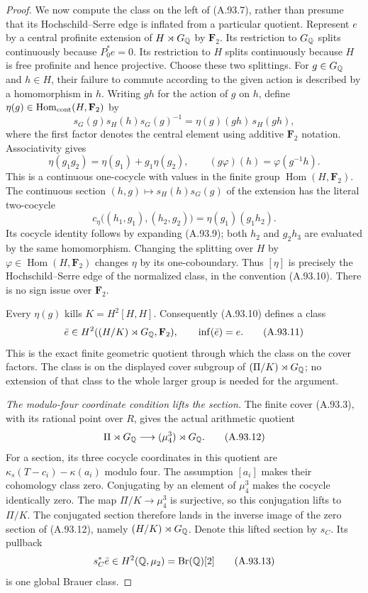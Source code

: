 \begin{proof}
We now compute the class on the left of
(A.93.7), rather than presume that its
Hochschild--Serre edge is inflated from a
particular quotient.
Represent $e$ by a central profinite extension
of $H\rtimes G_\mathbb Q$ by $\mathbf F_2$.
Its restriction to $G_\mathbb Q$ splits continuously
because $P_0^*e=0$.
Its restriction to $H$ splits continuously
because $H$ is free profinite and hence
projective.
Choose these two splittings.
For $g\in G_\mathbb Q$ and $h\in H$, their failure
to commute according to the given action is
described by a homomorphism in $h$.
Writing $gh$ for the action of $g$ on $h$,
define $\eta(g)\in\operatorname{Hom}_{\rm cont}
(H,\mathbf F_2)$ by
\[
 s_G(g)s_H(h)s_G(g)^{-1}
       =\eta(g)(gh)\,s_H(gh),
 \tag{A.93.8}
\]
where the first factor denotes the central
element using additive $\mathbf F_2$ notation.
Associativity gives
\[
                 \eta(g_1g_2)=\eta(g_1)+g_1\eta(g_2),
       \qquad (g\varphi)(h)=\varphi(g^{-1}h).
 \tag{A.93.9}
\]
This is a continuous one-cocycle with values
in the finite group
$\operatorname{Hom}(H,\mathbf F_2)$.
The continuous section
$(h,g)\mapsto s_H(h)s_G(g)$ of the extension
has the literal two-cocycle
\[
 c_\eta\bigl((h_1,g_1),(h_2,g_2)\bigr)
                          =\eta(g_1)(g_1h_2).
 \tag{A.93.10}
\]
Its cocycle identity follows by expanding
(A.93.9); both $h_2$ and $g_2h_3$ are
evaluated by the same homomorphism.
Changing the splitting over $H$ by
$\varphi\in\operatorname{Hom}(H,\mathbf F_2)$
changes $\eta$ by its one-coboundary.
Thus $[\eta]$ is precisely the
Hochschild--Serre edge of the normalized
class, in the convention (A.93.10).
There is no sign issue over $\mathbf F_2$.

Every $\eta(g)$ kills $K=H^2[H,H]$.
Consequently (A.93.10) defines a class
\[
 \bar e\in H^2((H/K)\rtimes G_\mathbb Q,\mathbf F_2),
 \qquad
      \operatorname{inf}(\bar e)=e .
 \tag{A.93.11}
\]
This is the exact finite geometric quotient
through which the class on the cover factors.
The class is on the displayed cover subgroup
of $(\Pi/K)\rtimes G_\mathbb Q$; no extension of
that class to the whole larger group is
needed for the argument.

\emph{The modulo-four coordinate condition lifts the section.}
The finite cover (A.93.3), with its rational
point over $R$, gives the actual arithmetic
quotient
\[
        \Pi\rtimes G_\mathbb Q\longrightarrow
                     (\mu_4^3)\rtimes G_\mathbb Q .
 \tag{A.93.12}
\]
For a section, its three cocycle coordinates
in this quotient are
$\kappa_s(T-c_i)-\kappa(a_i)$ modulo four.
The assumption $[a_i]$ makes their cohomology
class zero.
Conjugating by an element of $\mu_4^3$ makes
the cocycle identically zero.
The map $\Pi/K\to\mu_4^3$ is surjective, so
this conjugation lifts to $\Pi/K$.
The conjugated section therefore lands in
the inverse image of the zero section of
(A.93.12), namely
$(H/K)\rtimes G_\mathbb Q$.
Denote this lifted section by $s_C$.
Its pullback
\[
          s_C^*\bar e\in H^2(\mathbb Q,\mu_2)
                                  =\operatorname{Br}(\mathbb Q)[2]
 \tag{A.93.13}
\]
is one global Brauer class.


\end{proof}
